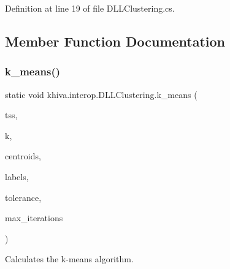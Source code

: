 Definition at line 19 of file D\+L\+L\+Clustering.\+cs.



\subsection{Member Function Documentation}
\mbox{\label{classkhiva_1_1interop_1_1_d_l_l_clustering_a1ee5a73f1c1cd9bbf4e4c6e8274473ee}} 
\subsubsection{\texorpdfstring{k\+\_\+means()}{k\_means()}}
{\footnotesize\ttfamily static void khiva.\+interop.\+D\+L\+L\+Clustering.\+k\+\_\+means (\begin{DoxyParamCaption}\item[{\mbox{[}\+In\mbox{]} ref Int\+Ptr}]{tss,  }\item[{\mbox{[}\+In\mbox{]} ref int}]{k,  }\item[{\mbox{[}\+Out\mbox{]} out Int\+Ptr}]{centroids,  }\item[{\mbox{[}\+Out\mbox{]} out Int\+Ptr}]{labels,  }\item[{\mbox{[}\+In\mbox{]} ref float}]{tolerance,  }\item[{\mbox{[}\+In\mbox{]} ref int}]{max\+\_\+iterations }\end{DoxyParamCaption})\hspace{0.3cm}{\ttfamily [static]}}



Calculates the k-\/means algorithm. 


